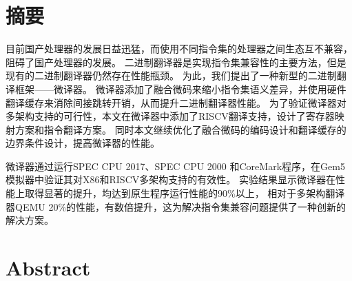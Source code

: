 \maketitle%
\MAKETITLE%
\makedeclaration%
\intobmk\chapter*{摘\quad 要}%
\setcounter{page}{1}%

目前国产处理器的发展日益迅猛，而使用不同指令集的处理器之间生态互不兼容，阻碍了国产处理器的发展。
二进制翻译器是实现指令集兼容性的主要方法，但是现有的二进制翻译器仍然存在性能瓶颈。
为此，我们提出了一种新型的二进制翻译框架——微译器。
微译器添加了融合微码来缩小指令集语义差异，并使用硬件翻译缓存来消除间接跳转开销，从而提升二进制翻译器性能。
为了验证微译器对多架构支持的可行性，本文在微译器中添加了RISCV翻译支持，设计了寄存器映射方案和指令翻译方案。
同时本文继续优化了融合微码的编码设计和翻译缓存的边界条件设计，提高微译器的性能。

微译器通过运行SPEC CPU 2017、SPEC CPU 2000 和CoreMark程序，在Gem5模拟器中验证其对X86和RISCV多架构支持的有效性。
实验结果显示微译器在性能上取得显著的提升，均达到原生程序运行性能的90\%以上，
相对于多架构翻译器QEMU 20\%的性能，有数倍提升，这为解决指令集兼容问题提供了一种创新的解决方案。

\intobmk\chapter*{Abstract}%

